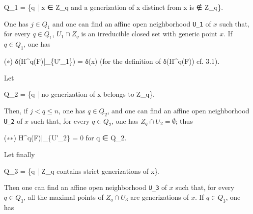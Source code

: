 \documentclass[
]{article}
\newenvironment{Shaded}{}{}
\newcommand{\NormalTok}[1]{#1}
\begin{document}
\begin{Shaded}
\begin{Highlighting}[]
\NormalTok{Q\_1 = \{q | x ∈ Z\_q and a generization of x distinct from x is ∉ Z\_q\}.}
\end{Highlighting}
\end{Shaded}

One has \(j \in Q_{1}\) and one can find an affine open neighborhood
\texttt{U\_1} of \(x\) such that, for every \(q \in Q_{1}\),
\(U_{1} \cap Z_{q}\) is an irreducible closed set with generic point
\(x\). If \(q \in Q_{1}\), one has

\begin{Shaded}
\begin{Highlighting}[]
\NormalTok{(∗)    δ(H\^{}q(F)|\_\{U′\_1\}) = δ(x)    (for the definition of δ(H\^{}q(F)) cf. 3.1).}
\end{Highlighting}
\end{Shaded}

Let

\begin{Shaded}
\begin{Highlighting}[]
\NormalTok{Q\_2 = \{q | no generization of x belongs to Z\_q\}.}
\end{Highlighting}
\end{Shaded}

Then, if \(j < q \leqslant n\), one has \(q \in Q_{2}\), and one can
find an affine open neighborhood \texttt{U\_2} of \(x\) such that, for
every \(q \in Q_{2}\), one has \(Z_{q} \cap U_{2} = \emptyset\); thus

\begin{Shaded}
\begin{Highlighting}[]
\NormalTok{(∗∗)   H\^{}q(F)|\_\{U′\_2\} = 0 for q ∈ Q\_2.}
\end{Highlighting}
\end{Shaded}

Let finally

\begin{Shaded}
\begin{Highlighting}[]
\NormalTok{Q\_3 = \{q | Z\_q contains strict generizations of x\}.}
\end{Highlighting}
\end{Shaded}

Then one can find an affine open neighborhood \texttt{U\_3} of \(x\)
such that, for every \(q \in Q_{3}\), all the maximal points of
\(Z_{q} \cap U_{3}\) are generizations of \(x\). If \(q \in Q_{3}\), one
has
\end{document}
